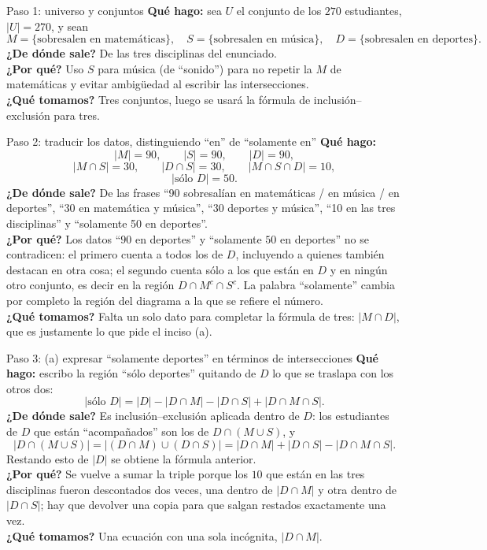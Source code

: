 \documentclass[11pt]{article}
\begin{document}
\begin{sol}

\begin{paso}{Paso 1: universo y conjuntos}
\textbf{Qu\'e hago:} sea $U$ el conjunto de los $270$ estudiantes, $|U|=270$, y sean
\[
M=\{\text{sobresalen en matem\'aticas}\},\quad
S=\{\text{sobresalen en m\'usica}\},\quad
D=\{\text{sobresalen en deportes}\}.
\]
\textbf{¿De d\'onde sale?} De las tres disciplinas del enunciado.\\
\textbf{¿Por qu\'e?} Uso $S$ para m\'usica (de ``sonido'') para no repetir la $M$ de matem\'aticas y evitar ambig\"uedad al escribir las intersecciones.\\
\textbf{¿Qu\'e tomamos?} Tres conjuntos, luego se usar\'a la f\'ormula de inclusi\'on--exclusi\'on para tres.
\end{paso}

\begin{paso}{Paso 2: traducir los datos, distinguiendo ``en'' de ``solamente en''}
\textbf{Qu\'e hago:}
\[
|M| = 90,\qquad |S| = 90,\qquad |D| = 90,
\]
\[
|M\cap S| = 30,\qquad |D\cap S| = 30,\qquad |M\cap S\cap D| = 10,
\]
\[
|\text{s\'olo }D| = 50 .
\]
\textbf{¿De d\'onde sale?} De las frases ``90 sobresal\'ian en matem\'aticas / en m\'usica / en deportes'', ``30 en matem\'atica y m\'usica'', ``30 deportes y m\'usica'', ``10 en las tres disciplinas'' y ``solamente 50 en deportes''.\\
\textbf{¿Por qu\'e?} Los datos ``$90$ en deportes'' y ``solamente $50$ en deportes'' no se contradicen: el primero cuenta a todos los de $D$, incluyendo a quienes tambi\'en destacan en otra cosa; el segundo cuenta s\'olo a los que est\'an en $D$ y en ning\'un otro conjunto, es decir en la regi\'on $D\cap M^{c}\cap S^{c}$. La palabra ``solamente'' cambia por completo la regi\'on del diagrama a la que se refiere el n\'umero.\\
\textbf{¿Qu\'e tomamos?} Falta un solo dato para completar la f\'ormula de tres: $|M\cap D|$, que es justamente lo que pide el inciso (a).
\end{paso}

\begin{paso}{Paso 3: (a) expresar ``solamente deportes'' en t\'erminos de intersecciones}
\textbf{Qu\'e hago:} escribo la regi\'on ``s\'olo deportes'' quitando de $D$ lo que se traslapa con los otros dos:
\[
|\text{s\'olo }D| = |D| - |D\cap M| - |D\cap S| + |D\cap M\cap S| .
\]
\textbf{¿De d\'onde sale?} Es inclusi\'on--exclusi\'on aplicada dentro de $D$: los estudiantes de $D$ que est\'an ``acompa\~nados'' son los de $D\cap(M\cup S)$, y
\[
|D\cap(M\cup S)| = |(D\cap M)\cup(D\cap S)| = |D\cap M| + |D\cap S| - |D\cap M\cap S| .
\]
Restando esto de $|D|$ se obtiene la f\'ormula anterior.\\
\textbf{¿Por qu\'e?} Se vuelve a sumar la triple porque los $10$ que est\'an en las tres disciplinas fueron descontados dos veces, una dentro de $|D\cap M|$ y otra dentro de $|D\cap S|$; hay que devolver una copia para que salgan restados exactamente una vez.\\
\textbf{¿Qu\'e tomamos?} Una ecuaci\'on con una sola inc\'ognita, $|D\cap M|$.
\end{paso}


\end{sol}
\end{document}
